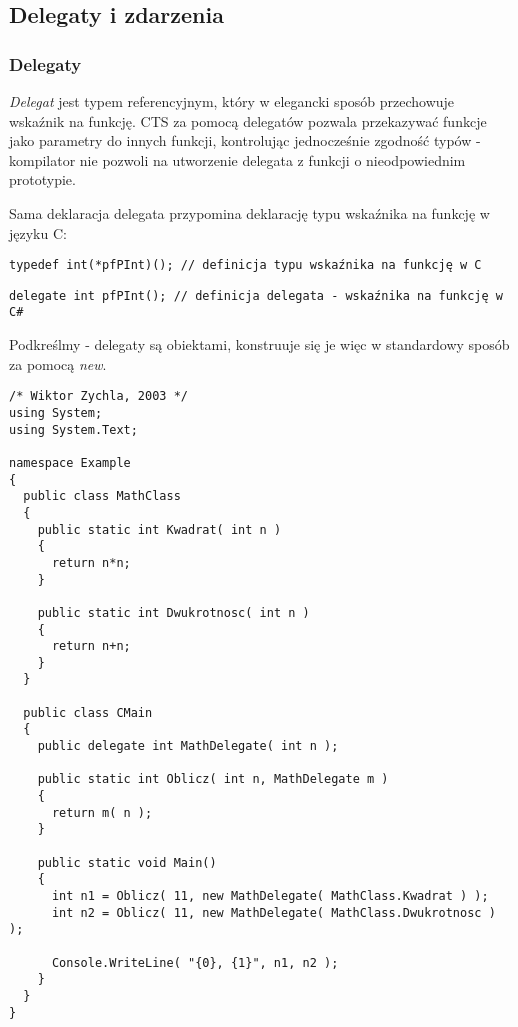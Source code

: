 ﻿\subsection{Delegaty i zdarzenia}
\label{delegaciZdarzenia}

\subsubsection{Delegaty}

{\em Delegat} jest typem referencyjnym, który w elegancki sposób przechowuje wskaźnik na funkcję. 
CTS za pomocą delegatów pozwala przekazywać funkcje jako parametry do innych funkcji, kontrolując 
jednocześnie zgodność typów - kompilator nie pozwoli na utworzenie delegata z funkcji o nieodpowiednim
prototypie.

Sama deklaracja delegata przypomina deklarację typu wskaźnika na funkcję w języku C:

\begin{scriptsize}
\begin{verbatim}
typedef int(*pfPInt)(); // definicja typu wskaźnika na funkcję w C
\end{verbatim}
\end{scriptsize}

\begin{scriptsize}
\begin{verbatim}
delegate int pfPInt(); // definicja delegata - wskaźnika na funkcję w C#
\end{verbatim}
\end{scriptsize}

Podkreślmy - delegaty są obiektami, konstruuje się je więc w standardowy sposób za pomocą {\em new}.

\begin{scriptsize}
\begin{verbatim}
/* Wiktor Zychla, 2003 */
using System;
using System.Text;

namespace Example
{ 
  public class MathClass
  {
  	public static int Kwadrat( int n )
  	{
  	  return n*n;
  	}
  	
  	public static int Dwukrotnosc( int n )
  	{
  	  return n+n;
  	}
  }
	
  public class CMain
  {    
    public delegate int MathDelegate( int n );
  	
    public static int Oblicz( int n, MathDelegate m )
    {
      return m( n );
    }
  	
    public static void Main()
    {
      int n1 = Oblicz( 11, new MathDelegate( MathClass.Kwadrat ) );
      int n2 = Oblicz( 11, new MathDelegate( MathClass.Dwukrotnosc ) );
    	
      Console.WriteLine( "{0}, {1}", n1, n2 );
    }
  }
}
\end{verbatim}
\end{scriptsize}

